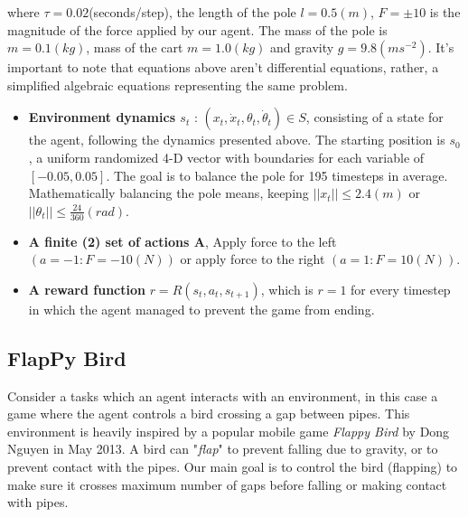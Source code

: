        where $\tau = 0.02$(seconds/step), the length of the pole $l = 0.5(m)$, $F = \pm10$ is the magnitude of the force applied by our agent. The mass of the pole is $m = 0.1(kg)$, mass of the cart $m = 1.0(kg)$ and gravity $g = 9.8(ms^{−2} )$. It's important to note that equations above aren't differential equations, rather, a simplified algebraic equations representing the same problem.
       \begin{itemize}
        \item \textbf{Environment dynamics $s_t$} : $(x_t,\dot{x}_t,\theta_t,\dot{\theta}_t) \in S$, consisting of a state for the agent, following the dynamics presented above. The starting position is $s_0$ , a uniform randomized 4-D vector with boundaries for each variable of $[-0.05,0.05]$. The goal is to balance the pole for 195 timesteps in average. Mathematically balancing the pole means, keeping $||x_t|| \leq 2.4(m)$ or $||\theta_t||\leq\frac{24}{360}(rad)$.
        \item \textbf{A finite (2) set of actions A}, Apply force to the left $(a=-1 : F=-10(N))$ or apply force to the right $(a=1 : F=10(N))$.
        \item \textbf{A reward function} $r=R(s_t,a_t,s_{t+1})$, which is $r=1$ for every timestep in which the agent managed to prevent the game from ending.
    \end{itemize}
    \subsection{FlapPy Bird}
    
    Consider a tasks which an agent interacts with an environment, in this case a game where the agent controls a bird crossing a gap between pipes. This environment is heavily inspired by a popular mobile game \textit{Flappy Bird} by Dong Nguyen in May 2013. A bird can "\textit{flap}" to prevent falling due to gravity, or to prevent contact with the pipes. Our main goal is to control the bird (flapping) to make sure it crosses maximum number of gaps before falling or making contact with pipes.
    
